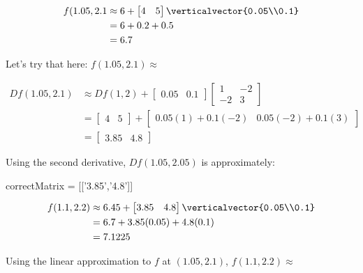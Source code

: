 \documentclass{ximera}
\begin{document}
\begin{question}
		\begin{solution}
			\begin{hint}
				\begin{align*}
					f(1.05,2.1 &\approx 6+\begin{bmatrix} 4 & 5 \end{bmatrix} \verticalvector{0.05\\0.1}\\
							&=6+0.2+0.5\\
							&=6.7
				\end{align*}
			\end{hint}
			Let's try that here:  $f(1.05,2.1) \approx$ 
		\end{solution}
		\begin{solution}
			\begin{hint}
				\begin{align*}
					Df(1.05,2.1) &\approx Df(1,2)+\begin{bmatrix} 0.05 & 0.1\end{bmatrix}\begin{bmatrix} 1 & -2 \\ -2 & 3\end{bmatrix}\\
										&= \begin{bmatrix} 4 & 5 \end{bmatrix} + \begin{bmatrix} 0.05(1)+0.1(-2) & 0.05(-2)+0.1(3)\end{bmatrix}\\
										&=\begin{bmatrix} 3.85 & 4.8\end{bmatrix}
				\end{align*}
			\end{hint}
			Using the second derivative, $Df(1.05,2.05) $ is approximately:
			\begin{matrix-answer}
				correctMatrix = [['3.85','4.8']]
			\end{matrix-answer}
		\end{solution}
		\begin{solution}
				\begin{hint}
				\begin{align*}
					f(1.1,2.2) &\approx 6.45+\begin{bmatrix} 3.85 & 4.8 \end{bmatrix} \verticalvector{0.05\\0.1}\\
							&=6.7+3.85(0.05)+4.8(0.1)\\
							&=7.1225
				\end{align*}
				\end{hint}
			Using the linear approximation to $f$ at $(1.05,2.1)$, $f(1.1,2.2) \approx$ \answer{$7.1225$ }
		\end{solution}
		

\end{question}
\end{document}
